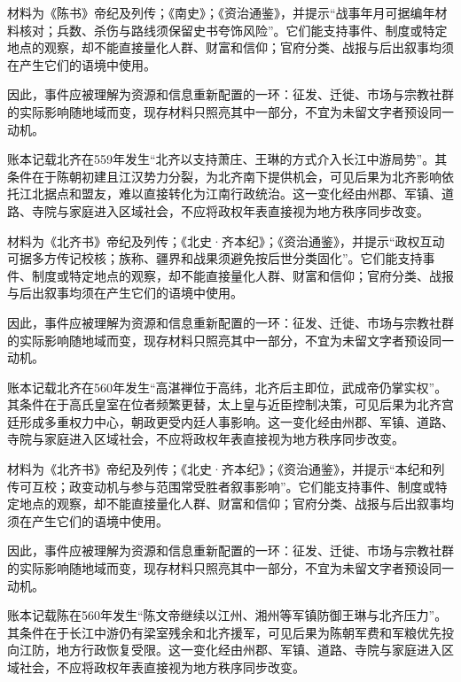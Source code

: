 材料为《陈书》帝纪及列传；《南史》；《资治通鉴》，并提示“战事年月可据编年材料核对；兵数、杀伤与路线须保留史书夸饰风险”。它们能支持事件、制度或特定地点的观察，却不能直接量化人群、财富和信仰；官府分类、战报与后出叙事均须在产生它们的语境中使用。

因此，事件应被理解为资源和信息重新配置的一环：征发、迁徙、市场与宗教社群的实际影响随地域而变，现存材料只照亮其中一部分，不宜为未留文字者预设同一动机。

账本记载北齐在559年发生“北齐以支持萧庄、王琳的方式介入长江中游局势”。其条件在于陈朝初建且江汉势力分裂，为北齐南下提供机会，可见后果为北齐影响依托江北据点和盟友，难以直接转化为江南行政统治。这一变化经由州郡、军镇、道路、寺院与家庭进入区域社会，不应将政权年表直接视为地方秩序同步改变。

材料为《北齐书》帝纪及列传；《北史·齐本纪》；《资治通鉴》，并提示“政权互动可据多方传记校核；族称、疆界和战果须避免按后世分类固化”。它们能支持事件、制度或特定地点的观察，却不能直接量化人群、财富和信仰；官府分类、战报与后出叙事均须在产生它们的语境中使用。

因此，事件应被理解为资源和信息重新配置的一环：征发、迁徙、市场与宗教社群的实际影响随地域而变，现存材料只照亮其中一部分，不宜为未留文字者预设同一动机。

账本记载北齐在560年发生“高湛禅位于高纬，北齐后主即位，武成帝仍掌实权”。其条件在于高氏皇室在位者频繁更替，太上皇与近臣控制决策，可见后果为北齐宫廷形成多重权力中心，朝政更受内廷人事影响。这一变化经由州郡、军镇、道路、寺院与家庭进入区域社会，不应将政权年表直接视为地方秩序同步改变。

材料为《北齐书》帝纪及列传；《北史·齐本纪》；《资治通鉴》，并提示“本纪和列传可互校；政变动机与参与范围常受胜者叙事影响”。它们能支持事件、制度或特定地点的观察，却不能直接量化人群、财富和信仰；官府分类、战报与后出叙事均须在产生它们的语境中使用。

因此，事件应被理解为资源和信息重新配置的一环：征发、迁徙、市场与宗教社群的实际影响随地域而变，现存材料只照亮其中一部分，不宜为未留文字者预设同一动机。

账本记载陈在560年发生“陈文帝继续以江州、湘州等军镇防御王琳与北齐压力”。其条件在于长江中游仍有梁室残余和北齐援军，可见后果为陈朝军费和军粮优先投向江防，地方行政恢复受限。这一变化经由州郡、军镇、道路、寺院与家庭进入区域社会，不应将政权年表直接视为地方秩序同步改变。

